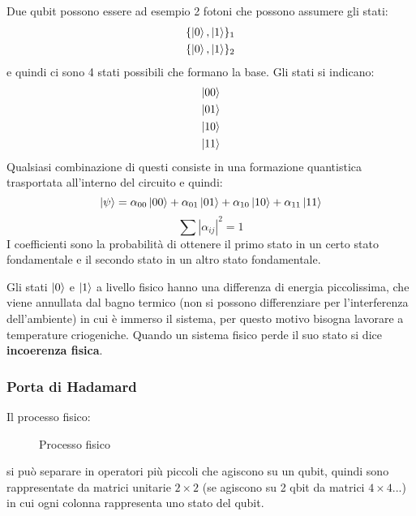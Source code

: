 \documentclass[a4paper]{article}
\begin{document}
\vspace{1em}
\noindent
Due qubit possono essere ad esempio 2 fotoni che possono assumere gli stati:
\[
  \begin{aligned}
    \{\ket{0}, \ket{1}\}_1\\
    \{\ket{0}, \ket{1}\}_2\\
  \end{aligned}
\] 
e quindi ci sono 4 stati possibili che formano la base. Gli stati si indicano:
\[
  \begin{aligned}
    \ket{00}\\
    \ket{01}\\
    \ket{10}\\
    \ket{11}
  \end{aligned}
\] 
Qualsiasi combinazione di questi consiste in una formazione quantistica trasportata all'interno
del circuito e quindi:
\[
  \ket{\psi} = \alpha_{00} \ket{00} + \alpha_{01} \ket{01} + \alpha_{10} \ket{10} + \alpha_{11} \ket{11}
\] 
\[
  \sum |\alpha_{ij}|^2 = 1
\] 
I coefficienti sono la probabilità di ottenere il primo stato in un certo stato fondamentale
e il secondo stato in un altro stato fondamentale.

\vspace{1em}
\noindent
Gli stati \( \ket{0} \) e \( \ket{1} \) a livello fisico hanno una differenza di energia
piccolissima, che viene annullata dal bagno termico (non si possono differenziare per
l'interferenza dell'ambiente) in cui è immerso il sistema, per
questo motivo bisogna lavorare a temperature criogeniche.
Quando un sistema fisico perde il suo stato si dice \textbf{incoerenza fisica}.

\subsubsection{Porta di Hadamard}
Il processo fisico:
\begin{figure}[H]
  \centering
  \caption{Processo fisico}
\end{figure}
\noindent
si può separare in operatori più piccoli che agiscono su un qubit, quindi sono rappresentate
da matrici unitarie \( 2 \times 2 \) (se agiscono su 2 qbit da matrici \( 4 \times 4 \)...)
in cui ogni colonna rappresenta uno stato del qubit.
\end{document}
